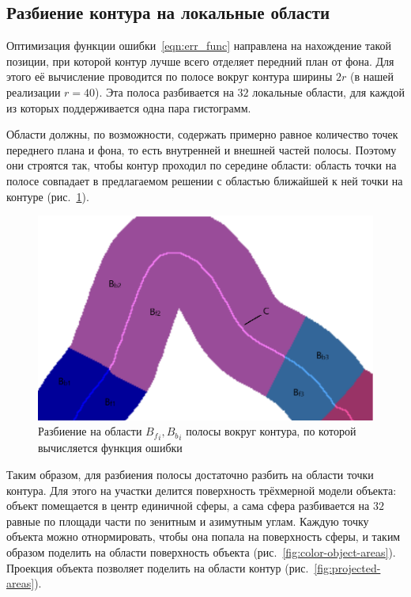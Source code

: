 \subsection{Разбиение контура на локальные области}\label{local-areas}

Оптимизация функции ошибки~\ref{eqn:err_func} направлена на нахождение такой
позиции, при которой контур лучше всего отделяет передний план от фона.
Для этого её вычисление проводится по полосе вокруг контура ширины $2r$ (в нашей
реализации $r = 40$).
Эта полоса разбивается на $32$ локальные области, для каждой из
которых поддерживается одна пара гистограмм.

Области должны, по возможности, содержать примерно равное количество точек
переднего плана и фона, то есть внутренней и внешней частей полосы.
Поэтому они строятся так, чтобы контур проходил по середине области: область
точки на полосе совпадает в предлагаемом решении с областью ближайшей
к ней точки на контуре (рис.~\ref{fig:fb_contour}).

\begin{figure}[t]
\centering
\includegraphics[width=\textwidth]{fig/fb_contour.png}
\caption{
Разбиение на области ${B_f}_i, {B_b}_i$ полосы вокруг контура, по которой
вычисляется функция ошибки
} \label{fig:fb_contour}
\end{figure}

Таким образом, для разбиения полосы достаточно разбить на области точки контура.
Для этого на участки делится поверхность трёхмерной модели объекта: объект
помещается в центр единичной сферы, а сама сфера разбивается на $32$ равные по
площади части по зенитным и азимутным углам.
Каждую точку объекта можно отнормировать, чтобы она попала на поверхность
сферы, и таким образом поделить на области поверхность объекта
(рис.~\ref{fig:color-object-areas}).
Проекция объекта позволяет поделить на области контур
(рис.~\ref{fig:projected-areas}).

